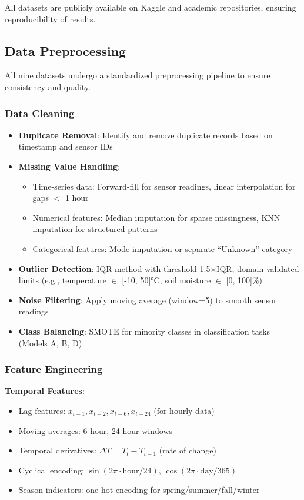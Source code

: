 \documentclass[conference]{IEEEtran}
\begin{document}
All datasets are publicly available on Kaggle and academic repositories, ensuring reproducibility of results.

\subsection{Data Preprocessing}

All nine datasets undergo a standardized preprocessing pipeline to ensure consistency and quality.

\subsubsection{Data Cleaning}
\begin{itemize}
\item \textbf{Duplicate Removal}: Identify and remove duplicate records based on timestamp and sensor IDs
\item \textbf{Missing Value Handling}: 
  \begin{itemize}
  \item Time-series data: Forward-fill for sensor readings, linear interpolation for gaps $<$ 1 hour
  \item Numerical features: Median imputation for sparse missingness, KNN imputation for structured patterns
  \item Categorical features: Mode imputation or separate ``Unknown'' category
  \end{itemize}
\item \textbf{Outlier Detection}: IQR method with threshold 1.5$\times$IQR; domain-validated limits (e.g., temperature $\in$ [-10, 50]°C, soil moisture $\in$ [0, 100]\%)
\item \textbf{Noise Filtering}: Apply moving average (window=5) to smooth sensor readings
\item \textbf{Class Balancing}: SMOTE for minority classes in classification tasks (Models A, B, D)
\end{itemize}

\subsubsection{Feature Engineering}
\textbf{Temporal Features}:
\begin{itemize}
\item Lag features: $x_{t-1}, x_{t-2}, x_{t-6}, x_{t-24}$ (for hourly data)
\item Moving averages: 6-hour, 24-hour windows
\item Temporal derivatives: $\Delta T = T_t - T_{t-1}$ (rate of change)
\item Cyclical encoding: $\sin(2\pi \cdot \text{hour}/24)$, $\cos(2\pi \cdot \text{day}/365)$
\item Season indicators: one-hot encoding for spring/summer/fall/winter
\end{itemize}
\end{document}
